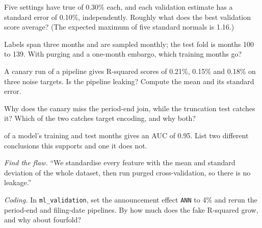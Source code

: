 \begin{exercise}[$\star$]\label{exo:ml:validation:1}
Five  settings have true  of 0.30\% each, and each validation estimate has a
standard error of 0.10\%, independently. Roughly what does the best validation score average? (The expected maximum of
five standard normals is 1.16.)
\end{exercise}

\begin{exercise}[$\star$]\label{exo:ml:validation:2}
Labels span three months and are sampled monthly; the test fold is months 100 to 139. With purging and a one-month
embargo, which training months go?
\end{exercise}

\begin{exercise}[$\star$]\label{exo:ml:validation:3}
A canary run of a pipeline gives R-squared scores of 0.21\%, 0.15\% and 0.18\% on three noise targets. Is the pipeline
leaking? Compute the mean and its standard error.
\end{exercise}

\begin{exercise}[$\star\star$]\label{exo:ml:validation:4}
Why does the canary miss the period-end join, while the truncation test catches it? Which of the two catches target
encoding, and why both?
\end{exercise}

\begin{exercise}[$\star\star$]\label{exo:ml:validation:5}
 of a model's training and test months gives an AUC of 0.95. List two different conclusions this
supports and one it does not.
\end{exercise}

\begin{exercise}[$\star\star$]\label{exo:ml:validation:6}
\emph{Find the flaw.} ``We standardise every feature with the mean and standard deviation of the whole dataset, then run
purged cross-validation, so there is no leakage.''
\end{exercise}

\begin{exercise}[$\star\star\star$]\label{exo:ml:validation:7}
\emph{Coding.} In \texttt{ml\_validation}, set the announcement effect \texttt{ANN} to 4\% and rerun the period-end and
filing-date pipelines. By how much does the fake R-squared grow, and why about fourfold?
\end{exercise}

